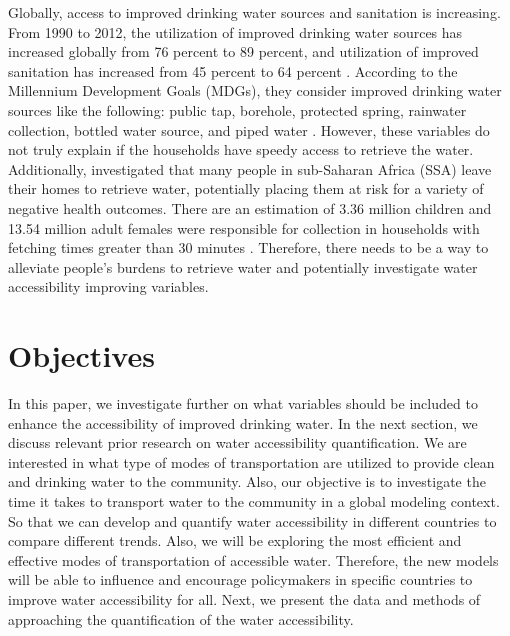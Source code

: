 \documentclass[10pt,twoside]{article}
\numberwithin{equation}{section}
\newcommand{\?}{\stackrel{?}{=}}
\newcommand{\rd}{\color{red}}
\begin{document}
Globally, access to improved drinking water sources and sanitation is increasing. From 1990 to 2012, the utilization of
improved drinking water sources has increased globally from 76 percent to 89 percent, and utilization of improved
sanitation has increased from 45 percent to 64 percent \citep{fuller2016tracking}. According to the Millennium Development Goals (MDGs),
they consider improved drinking water sources like the following: public tap, borehole, protected spring, rainwater
collection, bottled water source, and piped water \citep{bartram2014global}. However, these variables do not truly
explain if the households have speedy access to retrieve the water. Additionally, \citet{grahamAnalysisWaterCollection2016} investigated that many people in sub-Saharan Africa (SSA) leave their homes to retrieve water, potentially placing them at risk for a variety of negative health outcomes. There are an estimation of 3.36 million children and 13.54 million adult females were responsible for collection in households with fetching times greater than 30 minutes \citep{grahamAnalysisWaterCollection2016}. Therefore, there needs to be a way to alleviate people's burdens to retrieve water and potentially investigate water accessibility improving variables. 



\section{Objectives}
In this paper, we investigate further on what
variables should be included to enhance the accessibility of improved drinking water.
In the next section, we discuss relevant prior research on water accessibility quantification. We are interested in what type of modes of
transportation are utilized to provide clean and drinking water to the community. Also, our objective is to investigate
the time it takes to transport water to the community in a global modeling context. So that we can develop and quantify
water accessibility in different countries to compare different trends. Also, we will be exploring the most efficient
and effective modes of transportation of accessible water. Therefore, the new models will be able to influence and
encourage policymakers in specific countries to improve water accessibility for all. Next, we present the data and methods of approaching the quantification of the water accessibility. 
 
\end{document}
